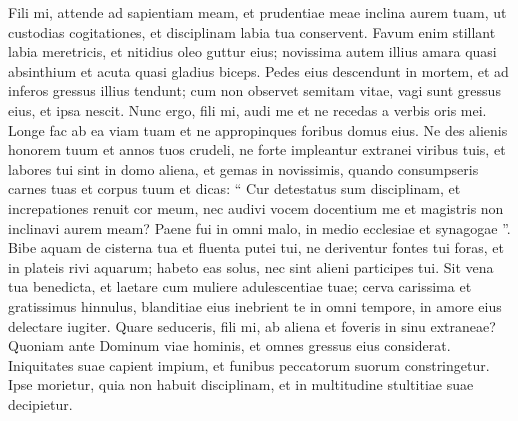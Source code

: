 \begin{biblechapter}
\begin{biblechapter}
\begin{biblechapter}
\begin{biblechapter}
\begin{biblechapter}
 \verse Fili mi, attende ad sapientiam meam,
 et prudentiae meae inclina aurem tuam,
 \verse ut custodias cogitationes,
 et disciplinam labia tua conservent.
 \verse Favum enim stillant labia meretricis,
 et nitidius oleo guttur eius;
 \verse novissima autem illius amara quasi absinthium
 et acuta quasi gladius biceps.
 \verse Pedes eius descendunt in mortem,
 et ad inferos gressus illius tendunt;
 \verse cum non observet semitam vitae,
 vagi sunt gressus eius, et ipsa nescit.
 \verse Nunc ergo, fili mi, audi me
 et ne recedas a verbis oris mei.
 \verse Longe fac ab ea viam tuam
 et ne appropinques foribus domus eius.
 \verse Ne des alienis honorem tuum
 et annos tuos crudeli,
 \verse ne forte impleantur extranei viribus tuis,
 et labores tui sint in domo aliena,
 \verse et gemas in novissimis,
 quando consumpseris carnes tuas et corpus tuum
 \verse et dicas: “ Cur detestatus sum disciplinam,
 et increpationes renuit cor meum,
 \verse nec audivi vocem docentium me
 et magistris non inclinavi aurem meam?
 \verse Paene fui in omni malo,
 in medio ecclesiae et synagogae ”.
 \verse Bibe aquam de cisterna tua
 et fluenta putei tui,
 \verse ne deriventur fontes tui foras,
 et in plateis rivi aquarum;
 \verse habeto eas solus,
 nec sint alieni participes tui.
 \verse Sit vena tua benedicta,
 et laetare cum muliere adulescentiae tuae;
 \verse cerva carissima et gratissimus hinnulus,
 blanditiae eius inebrient te in omni tempore,
 in amore eius delectare iugiter.
 \verse Quare seduceris, fili mi, ab aliena
 et foveris in sinu extraneae?
 \verse Quoniam ante Dominum viae hominis,
 et omnes gressus eius considerat.
 \verse Iniquitates suae capient impium,
 et funibus peccatorum suorum constringetur.
 \verse Ipse morietur, quia non habuit disciplinam,
 et in multitudine stultitiae suae decipietur.
 

\end{biblechapter}
\end{biblechapter}
\end{biblechapter}
\end{biblechapter}
\end{biblechapter}
